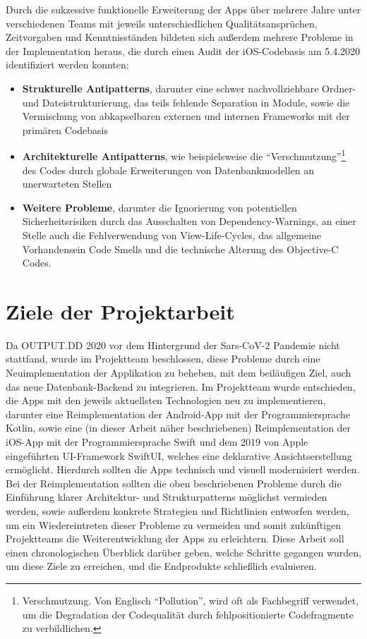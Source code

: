 Durch die sukzessive funktionelle Erweiterung der Apps über mehrere Jahre unter verschiedenen Teams mit jeweils unterschiedlichen Qualitätsansprüchen, Zeitvorgaben und Kenntnisständen bildeten sich außerdem mehrere Probleme in der Implementation heraus, die durch einen Audit der iOS-Codebasis am 5.4.2020 identifiziert werden konnten:

\begin{itemize}
  \item \textbf{Strukturelle Antipatterns}, darunter eine schwer nachvollziehbare Ordner- und Dateistrukturierung, das teils fehlende Separation in Module, sowie die Vermischung von abkapselbaren externen und internen Frameworks mit der primären Codebasis
  \item \textbf{Architekturelle Antipatterns}, wie beispielsweise die \enquote{Verschmutzung}\footnote{Verschmutzung. Von Englisch \enquote{Pollution}, wird oft als Fachbegriff verwendet, um die Degradation der Codequalität durch fehlpositionierte Codefragmente zu verbildlichen.} des Codes durch globale Erweiterungen von Datenbankmodellen an unerwarteten Stellen
  \item \textbf{Weitere Probleme}, darunter die Ignorierung von potentiellen Sicherheitsrisiken durch das Ausschalten von Dependency-Warnings, an einer Stelle auch die Fehlverwendung von View-Life-Cycles, das allgemeine Vorhandensein Code Smells und die technische Alterung des Objective-C Codes.
\end{itemize}

\section{Ziele der Projektarbeit}

Da OUTPUT.DD 2020 vor dem Hintergrund der Sars-CoV-2 Pandemie nicht stattfand, wurde im Projektteam beschlossen, diese Probleme durch eine Neuimplementation der Applikation zu beheben, mit dem beiläufigen Ziel, auch das neue Datenbank-Backend zu integrieren. Im Projektteam wurde entschieden, die Apps mit den jeweils aktuellsten Technologien neu zu implementieren, darunter eine Reimplementation der Android-App mit der Programmiersprache Kotlin, sowie eine (in dieser Arbeit näher beschriebenen) Reimplementation der iOS-App mit der Programmiersprache Swift und dem 2019 von Apple eingeführten UI-Framework SwiftUI, welches eine deklarative Ansichtserstellung ermöglicht. Hierdurch sollten die Apps technisch und visuell modernisiert werden. Bei der Reimplementation sollten die oben beschriebenen Probleme durch die Einführung klarer Architektur- und Strukturpatterns möglichst vermieden werden, sowie außerdem konkrete Strategien und Richtlinien entworfen werden, um ein Wiedereintreten dieser Probleme zu vermeiden und somit zukünftigen Projektteams die Weiterentwicklung der Apps zu erleichtern. Diese Arbeit soll einen chronologischen Überblick darüber geben, welche Schritte gegangen wurden, um diese Ziele zu erreichen, und die Endprodukte schließlich evaluieren.
